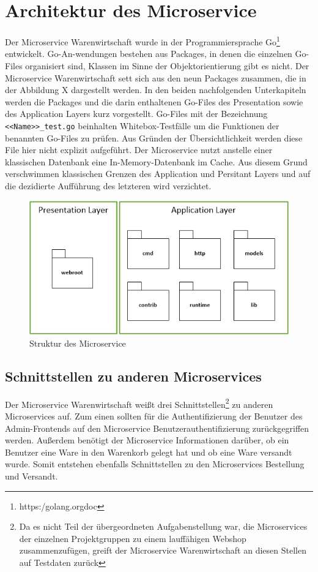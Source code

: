 \section{Architektur des Microservice}
\label{sec: Architektur des Microservice}
Der Microservice Warenwirtschaft wurde in der Programmiersprache Go\footnote{https:\//golang.org\/doc\/} entwickelt. Go-An-wendungen bestehen aus Packages, in denen die einzelnen Go-Files organisiert sind, Klassen im Sinne der Objektorientierung gibt es nicht. Der Microservice Warenwirtschaft sett sich aus den neun Packages zusammen, die in der Abbildung X dargestellt werden. In den beiden nachfolgenden Unterkapiteln werden die Packages und die darin enthaltenen Go-Files des Presentation  sowie des Application Layers kurz vorgestellt. Go-Files mit der Bezeichnung \texttt{<<Name>>\_test.go} beinhalten Whitebox-Testfälle um die Funktionen der benannten Go-Files zu prüfen. Aus Gründen der Übersichtlichkeit werden diese File hier nicht explizit aufgeführt. 
Der Microservice nutzt anstelle einer klassischen Datenbank eine In-Memory-Datenbank im Cache. Aus diesem Grund verschwimmen klassischen Grenzen des Application und Persitant Layers und auf die dezidierte Aufführung des letzteren wird verzichtet.

\begin{figure}[H]
	\begin{center}
	\includegraphics[width=0.65 \textwidth]{./Bilder/struktur.png}
	\end{center}
	\caption{Struktur des Microservice}
	\label{pic:Struktur des Microservice}
\end{figure}


\subsection{Schnittstellen zu anderen Microservices}
\label{subsec: Schnittstellen zu anderen Microservices}
Der Microservice Warenwirtschaft weißt drei Schnittstellen\footnote{Da es nicht Teil der übergeordneten Aufgabenstellung war, die Microservices der einzelnen Projektgruppen zu einem lauffähigen Webshop zusammenzufügen, greift der Microservice Warenwirtschaft an diesen Stellen auf Testdaten zurück} zu anderen Microservices auf. Zum einen sollten für die Authentifizierung der Benutzer des Admin-Frontends auf den Microservice Benutzerauthentifizierung zurückgegriffen werden. Außerdem benötigt der Microservice Informationen darüber, ob ein Benutzer eine Ware in den Warenkorb gelegt hat und ob eine Ware versandt wurde. Somit entstehen ebenfalls Schnittstellen zu den Microservices Bestellung und Versandt.

